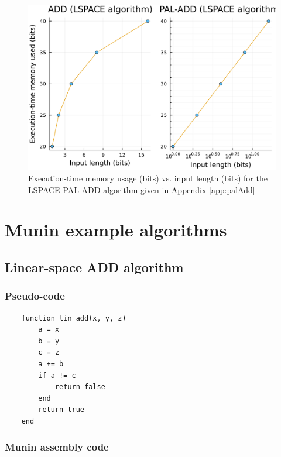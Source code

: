 \documentclass[11pt, a4paper]{article}
\begin{document}
\begin{figure}[H]
    \centering
    \includegraphics[width=\columnwidth]{PAL-ADD-(LSPACE-algorithm).png}
    \caption{Execution-time memory usage (bits) vs. input length (bits) for the LSPACE PAL-ADD algorithm given in Appendix \ref{app:palAdd}}
    \label{fig:palAdd}
\end{figure}

\newpage

\onecolumn

\appendix

\section{Munin example algorithms}
\subsection{Linear-space ADD algorithm}

\subsubsection{Pseudo-code}

\begin{lstlisting}
    function lin_add(x, y, z)
        a = x
        b = y
        c = z
        a += b
        if a != c
            return false
        end
        return true
    end
\end{lstlisting}

\subsubsection{Munin assembly code}
\end{document}
